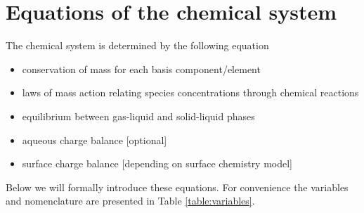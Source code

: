 \documentclass{article}
\begin{document}
\section{Equations of the chemical system}
The chemical system is determined by the following equation
\begin{itemize}
    \item conservation of mass for each basis component/element
    \item laws of mass action relating species concentrations through chemical reactions
    \item equilibrium between gas-liquid and solid-liquid phases
    \item aqueous charge balance [optional]
    \item surface charge balance [depending on surface chemistry model]
\end{itemize}

Below we will formally introduce these equations. For convenience the variables and nomenclature are presented in Table \ref{table:variables}.
\end{document}

